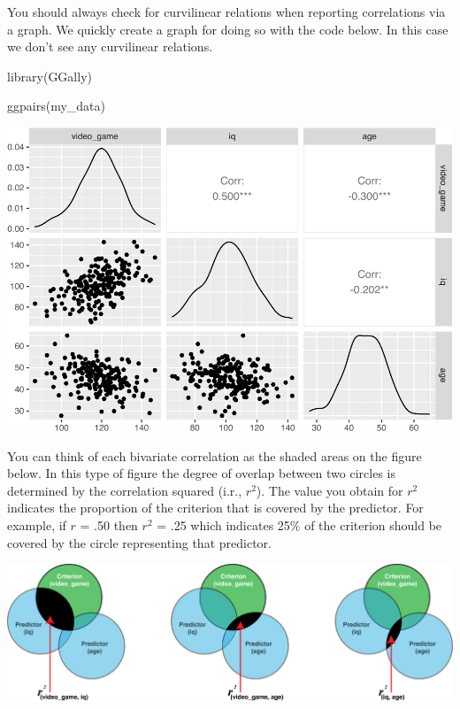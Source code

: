 \documentclass[
]{krantz}
\makeatletter
\newenvironment{Shaded}{\begin{snugshade}}{\end{snugshade}}
\newcommand{\FunctionTok}[1]{\textcolor[rgb]{0,0,0}{#1}}
\newcommand{\NormalTok}[1]{#1}
\newenvironment{kframe}{%
\medskip{}
\setlength{\fboxsep}{.8em}
 \def\at@end@of@kframe{}%
 \ifinner\ifhmode%
  \def\at@end@of@kframe{\end{minipage}}%
  \begin{minipage}{\columnwidth}%
 \fi\fi%
 \def\FrameCommand##1{\hskip\@totalleftmargin \hskip-\fboxsep
 \colorbox{shadecolor}{##1}\hskip-\fboxsep
     \hskip-\linewidth \hskip-\@totalleftmargin \hskip\columnwidth}%
 \MakeFramed {\advance\hsize-\width
   \@totalleftmargin\z@ \linewidth\hsize
   \@setminipage}}%
 {\par\unskip\endMakeFramed%
 \at@end@of@kframe}
\renewenvironment{Shaded}{\begin{kframe}}{\end{kframe}}
\makeatother
\begin{document}
You should always check for curvilinear relations when reporting correlations via a graph. We quickly create a graph for doing so with the code below. In this case we don't see any curvilinear relations.

\begin{Shaded}
\begin{Highlighting}[]
\FunctionTok{library}\NormalTok{(GGally)}

\FunctionTok{ggpairs}\NormalTok{(my\_data)}
\end{Highlighting}
\end{Shaded}

\includegraphics{bookdown_files/figure-latex/unnamed-chunk-441-1.pdf}

You can think of each bivariate correlation as the shaded areas on the figure below. In this type of figure the degree of overlap between two circles is determined by the correlation squared (i.r., \(r^2\)). The value you obtain for \(r^2\) indicates the proportion of the criterion that is covered by the predictor. For example, if \(r\) = .50 then \(r^2\) = .25 which indicates 25\% of the criterion should be covered by the circle representing that predictor.

\includegraphics[width=1\linewidth]{ch_multiple_regression/images/mr_venn_r}
\end{document}

